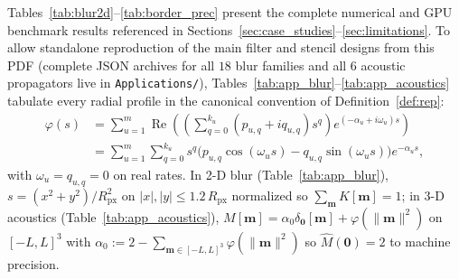 \documentclass[11pt,a4paper]{article}
\theoremstyle{plain}
\theoremstyle{definition}
\DeclareMathOperator{\RePart}{Re}
\begin{document}
Tables~\ref{tab:blur2d}--\ref{tab:border_prec} present the complete numerical and GPU benchmark results referenced in Sections~\ref{sec:case_studies}--\ref{sec:limitations}. To allow standalone reproduction of the main filter and stencil designs from this PDF (complete JSON archives for all $18$ blur families and all $6$ acoustic propagators live in \texttt{Applications/}), Tables~\ref{tab:app_blur}--\ref{tab:app_acoustics} tabulate every radial profile in the canonical convention of Definition~\ref{def:rep}:
\begin{equation}\label{eq:app_conv}
\begin{aligned}
  \varphi(s)
  &= \sum_{u=1}^m \RePart\!\left(\left(\sum_{q=0}^{k_u} (p_{u,q} + i q_{u,q}) s^q\right) e^{(-\alpha_u + i\omega_u)s}\right)\\
  &= \sum_{u=1}^m \sum_{q=0}^{k_u} s^q\bigl(p_{u,q}\cos(\omega_u s) - q_{u,q}\sin(\omega_u s)\bigr)e^{-\alpha_u s},
\end{aligned}
\end{equation}
with $\omega_u = q_{u,q} = 0$ on real rates. In 2-D blur (Table~\ref{tab:app_blur}), $s = (x^2 + y^2)/R_{\mathrm{px}}^2$ on $|x|, |y| \le 1.2\,R_{\mathrm{px}}$ normalized so $\sum_{\mathbf{m}} K[\mathbf{m}] = 1$; in 3-D acoustics (Table~\ref{tab:app_acoustics}), $M[\mathbf{m}] = \alpha_0\delta_{\mathbf{0}}[\mathbf{m}] + \varphi(\|\mathbf{m}\|^2)$ on $[-L, L]^3$ with $\alpha_0 := 2 - \sum_{\mathbf{m} \in [-L, L]^3} \varphi(\|\mathbf{m}\|^2)$ so $\widehat{M}(\mathbf{0}) = 2$ to machine precision.
\end{document}
